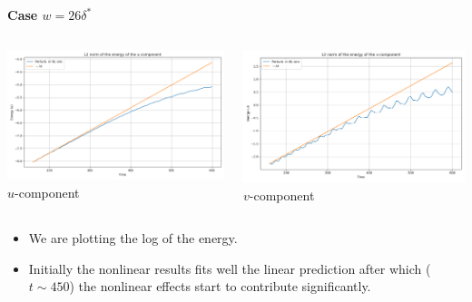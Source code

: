 \documentclass[
  aspectratio=169, %
  t, %
  onlytextwidth, %
  10pt, %
]{beamer}
\begin{document}
\begin{frame}
  \textbf{Case $w=26\delta^*$}

  \begin{columns}[T] %
    \begin{column}{0.48\linewidth} %
      {
	\centering
	\includegraphics[width=\linewidth]{Images/energyL2_error_u26.png}
	$u$-component
      }
    \end{column}
    \begin{column}{0.48\linewidth} %
      {
	\centering
	\includegraphics[width=\linewidth]{Images/energyL2_error_v26.png}
	$v$-component
      }
    \end{column}
  \end{columns}
  \begin{itemize}
    \item We are plotting the log of the energy.
    \item Initially the nonlinear results fits well the linear prediction after which ($t \sim 450$) the nonlinear effects start to contribute significantly.
  \end{itemize}
\end{frame}
\end{document}
